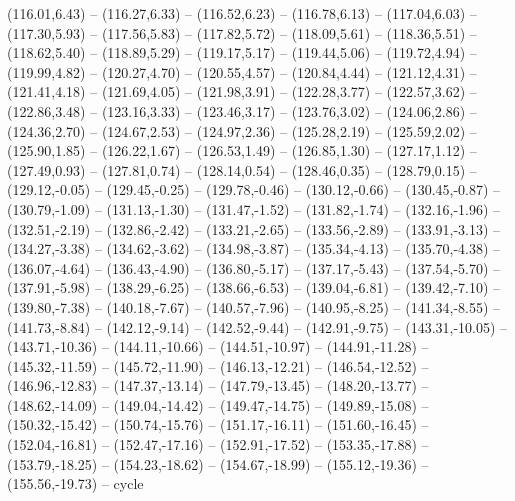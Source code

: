 {  (116.01,6.43) -- (116.27,6.33) -- (116.52,6.23) -- (116.78,6.13) -- (117.04,6.03) -- (117.30,5.93) -- (117.56,5.83) --
  (117.82,5.72) -- (118.09,5.61) -- (118.36,5.51) -- (118.62,5.40) -- (118.89,5.29) -- (119.17,5.17) -- (119.44,5.06) --
  (119.72,4.94) -- (119.99,4.82) -- (120.27,4.70) -- (120.55,4.57) -- (120.84,4.44) -- (121.12,4.31) -- (121.41,4.18) --
  (121.69,4.05) -- (121.98,3.91) -- (122.28,3.77) -- (122.57,3.62) -- (122.86,3.48) -- (123.16,3.33) -- (123.46,3.17) --
  (123.76,3.02) -- (124.06,2.86) -- (124.36,2.70) -- (124.67,2.53) -- (124.97,2.36) -- (125.28,2.19) -- (125.59,2.02) --
  (125.90,1.85) -- (126.22,1.67) -- (126.53,1.49) -- (126.85,1.30) -- (127.17,1.12) -- (127.49,0.93) -- (127.81,0.74) --
  (128.14,0.54) -- (128.46,0.35) -- (128.79,0.15) -- (129.12,-0.05) -- (129.45,-0.25) -- (129.78,-0.46) -- (130.12,-0.66) --
  (130.45,-0.87) -- (130.79,-1.09) -- (131.13,-1.30) -- (131.47,-1.52) -- (131.82,-1.74) -- (132.16,-1.96) -- (132.51,-2.19) --
  (132.86,-2.42) -- (133.21,-2.65) -- (133.56,-2.89) -- (133.91,-3.13) -- (134.27,-3.38) -- (134.62,-3.62) -- (134.98,-3.87) --
  (135.34,-4.13) -- (135.70,-4.38) -- (136.07,-4.64) -- (136.43,-4.90) -- (136.80,-5.17) -- (137.17,-5.43) -- (137.54,-5.70) --
  (137.91,-5.98) -- (138.29,-6.25) -- (138.66,-6.53) -- (139.04,-6.81) -- (139.42,-7.10) -- (139.80,-7.38) -- (140.18,-7.67) --
  (140.57,-7.96) -- (140.95,-8.25) -- (141.34,-8.55) -- (141.73,-8.84) -- (142.12,-9.14) -- (142.52,-9.44) -- (142.91,-9.75) --
  (143.31,-10.05) -- (143.71,-10.36) -- (144.11,-10.66) -- (144.51,-10.97) -- (144.91,-11.28) -- (145.32,-11.59) -- (145.72,-11.90) --
  (146.13,-12.21) -- (146.54,-12.52) -- (146.96,-12.83) -- (147.37,-13.14) -- (147.79,-13.45) -- (148.20,-13.77) -- (148.62,-14.09) --
  (149.04,-14.42) -- (149.47,-14.75) -- (149.89,-15.08) -- (150.32,-15.42) -- (150.74,-15.76) -- (151.17,-16.11) -- (151.60,-16.45) --
  (152.04,-16.81) -- (152.47,-17.16) -- (152.91,-17.52) -- (153.35,-17.88) -- (153.79,-18.25) -- (154.23,-18.62) -- (154.67,-18.99) --
  (155.12,-19.36) -- (155.56,-19.73) -- cycle}
